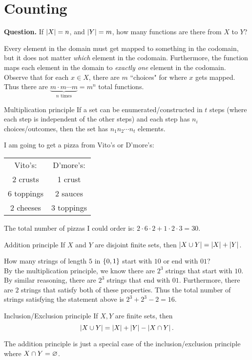 \documentclass[class=article, crop=false]{standalone}
\begin{document}
  \section{Counting}
  \textbf{Question.} If $\left\lvert X \right\rvert = n$, and $\left\lvert Y \right\rvert = m$, how many functions are there from $X$ to $Y$? \par
  Every element in the domain must get mapped to something in the codomain, but it does not matter \emph{which} element in the codomain. Furthermore, the function maps each element in the domain to \emph{exactly one} element in the codomain. Observe that for each $x\in X$, there are $m$ ``choices" for where $x$ gets mapped. Thus there are $\underbrace{m \cdot m \dotsm m}_{n \text{ times}} = m^n$ total functions.
  \begin{theorem}{Multiplication principle}
    If a set can be enumerated/constructed in $t$ steps (where each step is independent of the other steps) and each step has $n_i$ choices/outcomes, then the set has $n_1n_2\dotsm n_t$ elements.
  \end{theorem}
  \begin{example}{}
    I am going to get a pizza from Vito's or D'more's:
    \begin{center}\begin{tabular}{cc}
      Vito's: & D'more's: \\
      2 crusts & 1 crust \\
      6 toppings & 2 sauces \\
      2 cheeses & 3 toppings
    \end{tabular}\end{center}
    The total number of pizzas I could order is: $2 \cdot 6 \cdot 2 + 1 \cdot 2 \cdot 3 = 30$.
  \end{example}
  \begin{theorem}{Addition principle}
    If $X$ and $Y$ are disjoint finite sets, then $\left\lvert X\cup Y \right\rvert = \left\lvert X \right\rvert + \left\lvert Y \right\rvert$.
  \end{theorem}
  \begin{example}{}
    How many strings of length $5$ in $\left\{0, 1\right\}$ start with $10$ or end with $01$?\\[10pt]
    By the multiplication principle, we know there are $2^3$ strings that start with $10$. By similar reasoning, there are $2^3$ strings that end with $01$. Furthermore, there are $2$ strings that satisfy both of these properties. Thus the total number of strings satisfying the statement above is $2^3 + 2^3 - 2 = 16$.
  \end{example}
  \begin{theorem}{Inclusion/Exclusion principle}
    If $X, Y$ are finite sets, then
    \[
      \left\lvert X\cup Y \right\rvert = \left\lvert X \right\rvert + \left\lvert Y \right\rvert - \left\lvert X\cap Y \right\rvert.
    \]
  \end{theorem}
  \begin{note}{}
    The addition principle is just a special case of the inclusion/exclusion principle where $X\cap Y = \varnothing$.
  \end{note}
\end{document}
